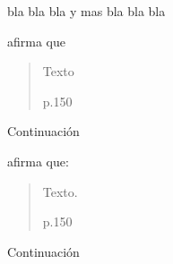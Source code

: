 bla bla bla y mas bla bla bla \Parencite{bibKey}



\textcite{bibKey} afirma que \blockquote[p.150]{Texto}. Continuación





\textcite{bibKey} afirma que: \blockquote[p.150]{Texto.} Continuación



% 		

